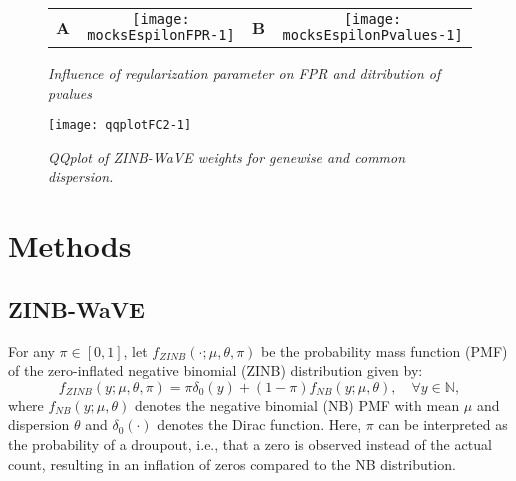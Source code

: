 \documentclass{article}
\begin{document}
\begin{figure}[ht]
\begin{center}
\begin{tabular}{cccc}
\textbf{A} &
\texttt{[image: mocksEspilonFPR-1]} &
\textbf{B} &
\texttt{[image: mocksEspilonPvalues-1]} 
\end{tabular}
\end{center}
\caption{{\em Influence of regularization parameter on FPR and ditribution of pvalues}}
\label{f:mocksEpsilon}
\end{figure}


\begin{figure}[ht]
\begin{center}
\texttt{[image: qqplotFC2-1]}
\end{center}
\caption{{\em QQplot of ZINB-WaVE weights for genewise and common dispersion.}}
\label{f:qqplotFC2}
\end{figure}

\section*{Methods}

\subsection*{ZINB-WaVE}

For any \(\pi\in[0,1]\), let \(f_{ZINB}( \cdot;\mu,\theta, \pi)\) be the probability mass function (PMF) of the zero-inflated negative binomial (ZINB) distribution given by:
\begin{equation}
f_{ZINB}(y;\mu,\theta, \pi) = \pi \delta_0(y) + (1-\pi) f_{NB}(y;\mu,\theta), \quad \forall y\in\mathbb{N},
\end{equation} 
where 
$f_{NB}(y;\mu,\theta)$ denotes the negative binomial (NB) PMF with mean $\mu$ and dispersion $\theta$ and \(\delta_0(\cdot)\) denotes the Dirac function. Here, \(\pi\) can be
interpreted as the probability of a droupout, i.e., that a zero is observed instead of the
actual count, resulting in an inflation of zeros compared to the NB distribution. 
\end{document}
